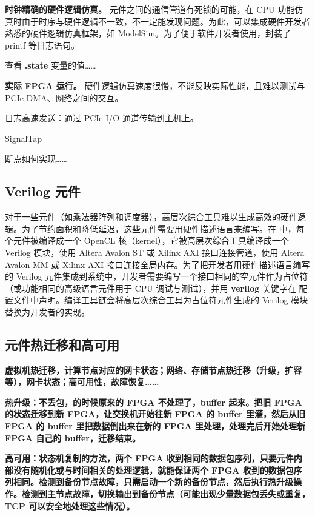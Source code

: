 \textbf{时钟精确的硬件逻辑仿真。}
元件之间的通信管道有死锁的可能，在 CPU 功能仿真时由于时序与硬件逻辑不一致，不一定能发现问题。为此，\name 可以集成硬件开发者熟悉的硬件逻辑仿真框架，如 ModelSim。为了便于软件开发者使用，\name 封装了 printf 等日志语句。

查看 \textbf{.state} 变量的值……

\textbf{实际 FPGA 运行。}
硬件逻辑仿真速度很慢，不能反映实际性能，且难以测试与 PCIe DMA、网络之间的交互。

日志高速发送：通过 PCIe I/O 通道传输到主机上。

SignalTap

断点如何实现……

\subsection{Verilog 元件}

对于一些元件（如乘法器阵列和调度器），高层次综合工具难以生成高效的硬件逻辑。为了节约面积和降低延迟，这些元件需要用硬件描述语言来编写。在 \name 中，每个元件被编译成一个 OpenCL 核（kernel），它被高层次综合工具编译成一个 Verilog 模块，使用 Altera Avalon ST 或 Xilinx AXI 接口连接管道，使用 Altera Avalon MM 或 Xilinx AXI 接口连接全局内存。为了把开发者用硬件描述语言编写的 Verilog 元件集成到系统中，开发者需要编写一个接口相同的空元件作为占位符（或功能相同的高级语言元件用于 CPU 调试与测试），并用 \textbf{verilog} 关键字在 \name 配置文件中声明。编译工具链会将高层次综合工具为占位符元件生成的 Verilog 模块替换为开发者的实现。

\subsection{元件热迁移和高可用}

\textbf{虚拟机热迁移，计算节点对应的网卡状态；网络、存储节点热迁移（升级，扩容等），网卡状态；高可用性，故障恢复……}

\textbf{热升级：不丢包，的时候原来的 FPGA 不处理了，buffer 起来。把旧 FPGA 的状态迁移到新 FPGA，让交换机开始往新 FPGA 的 buffer 里灌，然后从旧 FPGA 的 buffer 里把数据倒出来在新的 FPGA 里处理，处理完后开始处理新 FPGA 自己的 buffer，迁移结束。}

\textbf{高可用：状态机复制的方法，两个 FPGA 收到相同的数据包序列，只要元件内部没有随机化或与时间相关的处理逻辑，就能保证两个 FPGA 收到的数据包序列相同。检测到备份节点故障，只需启动一个新的备份节点，然后执行热升级操作。检测到主节点故障，切换输出到备份节点（可能出现少量数据包丢失或重复，TCP 可以安全地处理这些情况）。}


